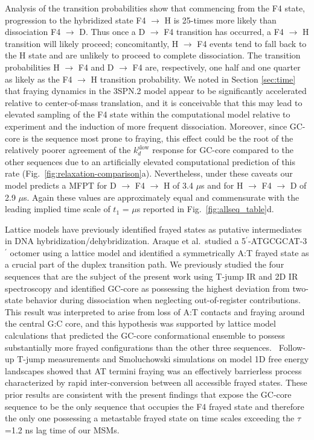\documentclass[journal=jpcbfk,manuscript=article]{achemso}
\newcommand*{\rood}[1]{{\color{red}{#1}}}
\begin{document}
Analysis of the transition probabilities show that commencing from the F4 state, progression to the hybridized state F4 $\rightarrow$ H is 25-times more likely than dissociation F4 $\rightarrow$ D. Thus once a D $\rightarrow$ F4 transition has occurred, a F4 $\rightarrow$ H transition will likely proceed; concomitantly, H $\rightarrow$ F4 events tend to fall back to the H state and are unlikely to proceed to complete dissociation. The transition probabilities H $\rightarrow$ F4 and D $\rightarrow$ F4 are, respectively, one half and one quarter as likely as the F4 $\rightarrow$ H transition probability. We noted in Section \ref{sec:time} that fraying dynamics in the 3SPN.2 model appear to be significantly accelerated relative to center-of-mass translation, and it is conceivable that this may lead to elevated sampling of the F4 state within the computational model relative to experiment and the induction of more frequent dissociation. Moreover, since GC-core is the sequence most prone to fraying, this effect could be the root of the relatively poorer agreement of the $k_d^\mathrm{slow}$ response for GC-core compared to the other sequences due to an artificially elevated computational prediction of this rate (Fig.~\ref{fig:relaxation-comparison}a). Nevertheless, under these caveats our model predicts a MFPT for D $\rightarrow$ F4 $\rightarrow$ H of 3.4 $\mu$s and for H $\rightarrow$ F4 $\rightarrow$ D of 2.9 $\mu$s. Again these values are approximately equal and commensurate with the leading implied time scale of $t_1$ = \rood{XX} $\mu$s reported in Fig.~\ref{fig:allseq_table}d.

Lattice models have previously identified frayed states as putative intermediates in DNA hybridization/dehybridization.\citep{Araque2016LatticeCooperativity, Phys2019,Sanstead2016} Araque et al.\ studied a 5$^\prime$-ATGCGCAT-3$^\prime$ octomer using a lattice model and identified a symmetrically A:T frayed state as a crucial part of the duplex transition path.\citep{Araque2016LatticeCooperativity} We previously studied the four sequences that are the subject of the present work using T-jump IR and 2D IR spectroscopy and identified GC-core as possessing the highest deviation from two-state behavior during dissociation when neglecting out-of-register contributions.\citep{Sanstead2016} This result was interpreted to arise from loss of A:T contacts and fraying around the central G:C core, and this hypothesis was supported by lattice model calculations that predicted the GC-core conformational ensemble to possess substantially more frayed configurations than the other three sequences.~\citep{Phys2019} Follow-up T-jump measurements and Smoluchowski simulations on model 1D free energy landscapes showed that AT termini fraying was an effectively barrierless process characterized by rapid inter-conversion between all accessible frayed states.\citep{Sanstead2018DirectDehybridization} These prior results are consistent with the present findings that expose the GC-core sequence to be the only sequence that occupies the F4 frayed state and therefore the only one possessing a metastable frayed state on time scales exceeding the $\tau$=1.2 ns lag time of our MSMs.
\end{document}
